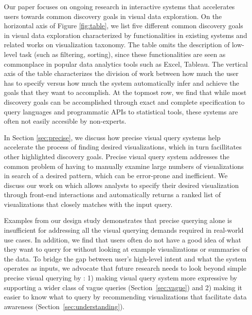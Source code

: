 \par Our paper focuses on ongoing research in interactive systems that accelerates users towards common discovery goals in visual data exploration. On the horizontal axis of Figure \ref{fig:table}, we list five different common discovery goals in visual data exploration characterized by functionalities in existing systems and related works on visualization taxonomy\cite{Heer2012,Amar2005}. The table omits the description of low-level task (such as filtering, sorting), since these functionalities are seen as commonplace in popular data analytics tools such as Excel, Tableau. The vertical axis of the table characterizes the division of work between how much the user has to specify versus how much the system automatically infer and achieve the goals that they want to accomplish. At the topmost row, we find that while most discovery goals can be accomplished through exact and complete specification to query languages and programmatic APIs to statistical tools, these systems are often not easily accesible by non-experts.
\par In Section \ref{sec:precise}, we discuss how precise visual query systems help accelerate the process of finding desired visualizations, which in turn facillitates other highlighted discovery goals. Precise visual query system addresses the common problem of having to manually examine large numbers of visualizations in search of a desired pattern, which can be error-prone and inefficient. We discuss our work on \zv which allows analysts to specify their desired visualization through front-end interactions and automatically returns a ranked list of visualizations that closely matches with the input query.
\par Examples from our \zv design study demonstrates that precise querying alone is insufficient for addressing all the visual querying demands required in real-world use cases. In addition, we find that users often do not have a good idea of what they want to query for without looking at example visualizations or summaries of the data. To bridge the gap between user's high-level intent and what the system operates as inputs, we advocate that future research needs to look beyond simple precise visual querying by : 1) making visual query system more expressive by supporting a wider class of vague queries (Section~\ref{sec:vague}) and 2) making it easier to know what to query by recommending visualizations that facilitate data awareness (Section~\ref{sec:understanding}).
